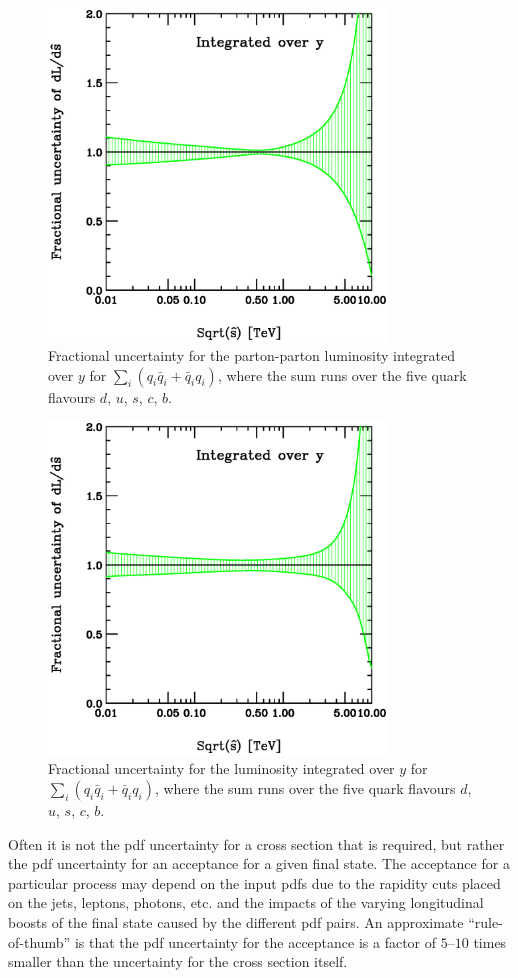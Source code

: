 \documentclass[12pt]{iopart}
\begin{document}
\begin{figure}[t]
\begin{center}
\includegraphics[width=9cm]{figlum7yall.ps}
\end{center}
\caption{
Fractional uncertainty for the parton-parton luminosity integrated over $y$
for $\sum_i (q_i{\bar q}_i+{\bar q}_iq_i)$,
where the sum runs over the five quark flavours $d$, $u$, $s$, $c$, $b$.
\label{fig:figlum7yall}
}
\end{figure}
%
%
\begin{figure}[t]
\begin{center}
\includegraphics[width=9cm]{figlum8yall.ps}
\end{center}
\caption{
Fractional uncertainty for the luminosity integrated over $y$
for $\sum_i (q_i{\bar q}_i+{\bar q}_iq_i)$,
where the sum runs over the five quark flavours $d$, $u$, $s$, $c$, $b$.
\label{fig:figlum8yall}
}
\end{figure}
%
Often it is not the pdf uncertainty for a cross section that is required, but rather the pdf uncertainty for an acceptance for a given
final state. The acceptance for a particular process may depend on the input pdfs due to the rapidity cuts placed on the jets, leptons,
photons, etc. and the impacts of the varying longitudinal boosts of the final state caused by the different pdf pairs. An approximate
``rule-of-thumb'' is that the pdf uncertainty for the acceptance is a factor of $5$--$10$ times smaller than the uncertainty for
the cross section itself. 
\end{document}

